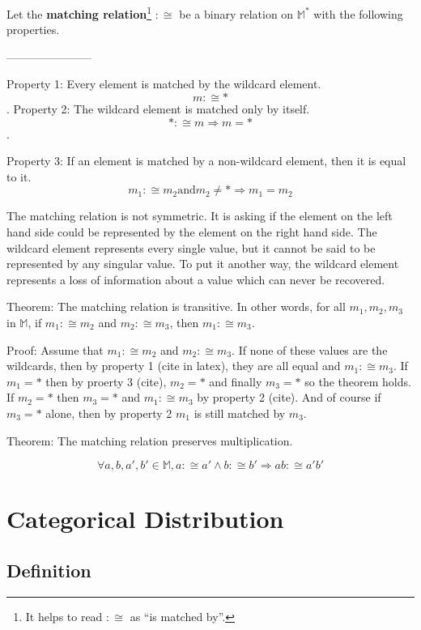 \documentclass[twoside]{article}
\newcommand{\quotes}[1]{``#1''}
\begin{document}
Let the \textbf{matching relation}\footnote{It helps to read \(:\cong\) as \quotes{is matched by}.} \(:\cong\) be a binary relation on \(\mathbb{M}^*\) with the following properties.

-----------------------

Property 1: Every element is matched by the wildcard element. \[m :\cong \ast\].
Property 2: The wildcard element is matched only by itself. \[\ast :\cong m \Longrightarrow m = \ast\].

Property 3: If an element is matched by a non-wildcard element, then it is equal to it. 
\[m_1 :\cong m_2 \text{and} m_2 \neq \ast \Longrightarrow m_1 = m_2\]


The matching relation is not symmetric. It is asking if the element on the left hand side could be represented by the element on the right hand side. The wildcard element represents every single value, but it cannot be said to be represented by any singular value. To put it another way, the wildcard element represents a loss of information about a value which can never be recovered.

Theorem: The matching relation is transitive. In other words, for all \(m_1, m_2, m_3\) in \(\mathbb{M}\), if \(m_1 :\cong m_2\) and \(m_2 :\cong m_3\), then \(m_1 :\cong m_3\).

Proof: Assume that \(m_1 :\cong m_2\) and \(m_2 :\cong m_3\). If none of these values are the wildcards, then by property 1 (cite in latex), they are all equal and \(m_1 :\cong m_3\). If \(m_1 = \ast\) then by proerty 3 (cite), \(m_2 = \ast\) and finally \(m_3 = \ast\) so the theorem holds. If \(m_2 = \ast\) then \(m_3 = \ast\) and \(m_1 :\cong m_3\) by property 2 (cite). And of course if \(m_3 = \ast\) alone, then by property 2 \(m_1\) is still matched by \(m_3\).

Theorem: The matching relation preserves multiplication.

\begin{equation}
\label{eq:matching_multiplication}
\forall a,b,a',b' \in \mathbb{M}, a :\cong a' \wedge b :\cong b' \Rightarrow ab :\cong a'b'
\end{equation}

\section{Categorical Distribution}

\subsection{Definition}
\end{document}
